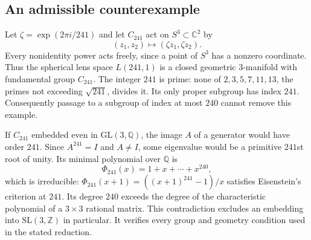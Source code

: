 \documentclass[10pt]{article}
\begin{document}
\subsection*{An admissible counterexample}
Let \(\zeta=\exp(2\pi i/241)\) and let \(C_{241}\) act on \(S^3\subset\mathbb C^2\) by \[(z_1,z_2)\longmapsto(\zeta z_1,\zeta z_2).\] Every nonidentity power acts freely, since a point of \(S^3\) has a nonzero coordinate. Thus the spherical lens space \(L(241,1)\) is a closed geometric 3-manifold with fundamental group \(C_{241}\). The integer \(241\) is prime: none of \(2,3,5,7,11,13\), the primes not exceeding \(\sqrt{241}\), divides it. Its only proper subgroup has index \(241\). Consequently passage to a subgroup of index at most \(240\) cannot remove this example.\par
If \(C_{241}\) embedded even in \(\mathrm{GL}(3,\mathbb Q)\), the image \(A\) of a generator would have order \(241\). Since \(A^{241}=I\) and \(A\ne I\), some eigenvalue would be a primitive \(241\)st root of unity. Its minimal polynomial over \(\mathbb Q\) is \[\Phi_{241}(x)=1+x+\cdots+x^{240},\] which is irreducible: \(\Phi_{241}(x+1)=((x+1)^{241}-1)/x\) satisfies Eisenstein’s criterion at \(241\). Its degree \(240\) exceeds the degree of the characteristic polynomial of a \(3\times3\) rational matrix. This contradiction excludes an embedding into \(\mathrm{SL}(3,\mathbb Z)\) in particular. It verifies every group and geometry condition used in the stated reduction.\par
\end{document}
